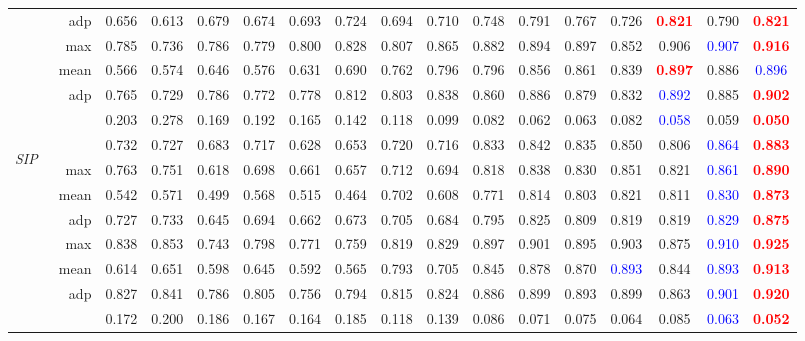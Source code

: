\documentclass[journal]{IEEEtran}
\newcommand{\trb}[1]{\textbf{\textcolor{red}{#1}}}
\newcommand{\tbb}[1]{\textcolor{blue}{#1}}
\newcommand{\SIP}{\textit{SIP}~\cite{fan2019D3Net}}
\begin{document}
\begin{table*}[t!]
\begin{tabular}{lr|ccccc|ccccccccc|c}
		& adp      & 0.656 & 0.613 & 0.679 & 0.674 & 0.693 & 0.724 & 0.694 & 0.710 & 0.748 & 0.791 & 0.767 & 0.726 & \trb{0.821} & 0.790 & \trb{0.821} \\
		& max        & 0.785 & 0.736 & 0.786 & 0.779 & 0.800 & 0.828 & 0.807 & 0.865 & 0.882 & 0.894 & 0.897 & 0.852 & 0.906 & \tbb{0.907} & \trb{0.916} \\
		& mean      & 0.566 & 0.574 & 0.646 & 0.576 & 0.631 & 0.690 & 0.762 & 0.796 & 0.796 & 0.856 & 0.861 & 0.839 & \trb{0.897} & 0.886 & \tbb{0.896} \\
		& adp      & 0.765 & 0.729 & 0.786 & 0.772 & 0.778 & 0.812 & 0.803 & 0.838 & 0.860 & 0.886 & 0.879 & 0.832 & \tbb{0.892} & 0.885 & \trb{0.902} \\
		&  & 0.203 & 0.278 & 0.169 & 0.192 & 0.165 & 0.142 & 0.118 & 0.099 & 0.082 & 0.062 & 0.063 & 0.082 & \tbb{0.058} & 0.059 & \trb{0.050} \\
		\midrule
		\multirow{8}{*}{\begin{sideways}\SIP\end{sideways}}
		&     & 0.732 & 0.727 & 0.683 & 0.717 & 0.628 & 0.653 & 0.720 & 0.716 & 0.833 & 0.842 & 0.835 & 0.850 & 0.806 & \tbb{0.864} & \trb{0.883} \\
		& max      & 0.763 & 0.751 & 0.618 & 0.698 & 0.661 & 0.657 & 0.712 & 0.694 & 0.818 & 0.838 & 0.830 & 0.851 & 0.821 & \tbb{0.861} & \trb{0.890} \\
		& mean      & 0.542 & 0.571 & 0.499 & 0.568 & 0.515 & 0.464 & 0.702 & 0.608 & 0.771 & 0.814 & 0.803 & 0.821 & 0.811 & \tbb{0.830} & \trb{0.873} \\
		& adp      & 0.727 & 0.733 & 0.645 & 0.694 & 0.662 & 0.673 & 0.705 & 0.684 & 0.795 & 0.825 & 0.809 & 0.819 & 0.819 & \tbb{0.829} & \trb{0.875} \\
		& max        & 0.838 & 0.853 & 0.743 & 0.798 & 0.771 & 0.759 & 0.819 & 0.829 & 0.897 & 0.901 & 0.895 & 0.903 & 0.875 & \tbb{0.910} & \trb{0.925} \\
		& mean      & 0.614 & 0.651 & 0.598 & 0.645 & 0.592 & 0.565 & 0.793 & 0.705 & 0.845 & 0.878 & 0.870 & \tbb{0.893} & 0.844 & \tbb{0.893} & \trb{0.913} \\
		& adp      & 0.827 & 0.841 & 0.786 & 0.805 & 0.756 & 0.794 & 0.815 & 0.824 & 0.886 & 0.899 & 0.893 & 0.899 & 0.863 & \tbb{0.901} & \trb{0.920} \\
		&  & 0.172 & 0.200 & 0.186 & 0.167 & 0.164 & 0.185 & 0.118 & 0.139 & 0.086 & 0.071 & 0.075 & 0.064 & 0.085 & \tbb{0.063} & \trb{0.052} \\
		\bottomrule
		\hline
	\end{tabular}
	\label{tab:Results}
\end{table*}
\end{document}
